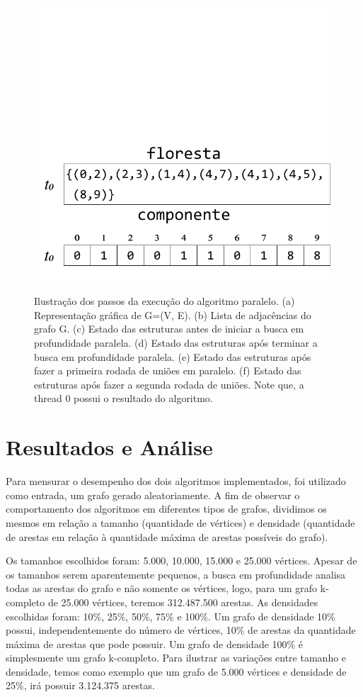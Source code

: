 \documentclass[12pt]{article}
\begin{document}
\begin{figure}[H]
{		\includegraphics[width=\linewidth]{figF.pdf}
	}
	\caption{Ilustração dos passos da execução do algoritmo paralelo. (a) Representação gráfica de G=(V, E). (b) Lista de adjacências do grafo G. (c) Estado das estruturas antes de iniciar a busca em profundidade paralela. (d) Estado das estruturas após terminar a busca em profundidade paralela. (e) Estado das estruturas após fazer a primeira rodada de uniões em paralelo. (f) Estado das estruturas após fazer a segunda rodada de uniões. Note que, a thread 0 possui o resultado do algoritmo.}
		\label{fig:1}
\end{figure}

\section{Resultados e Análise}
\label{resultados}

Para mensurar o desempenho dos dois algoritmos implementados, foi utilizado como entrada, um grafo gerado aleatoriamente. A fim de observar o comportamento dos algoritmos em diferentes tipos de grafos, dividimos os mesmos em relação a tamanho (quantidade de vértices) e densidade (quantidade de arestas em relação à quantidade máxima de arestas possíveis do grafo).

Os tamanhos escolhidos foram: 5.000, 10.000, 15.000 e 25.000 vértices. Apesar de os tamanhos serem aparentemente pequenos, a busca em profundidade analisa todas as arestas do grafo e não somente os vértices, logo, para um grafo k-completo de 25.000 vértices, teremos 312.487.500 arestas. As densidades escolhidas foram: 10\%, 25\%, 50\%, 75\% e 100\%. Um grafo de densidade 10\% possui, independentemente do número de vértices, 10\% de arestas da quantidade máxima de arestas que pode possuir. Um grafo de densidade 100\% é simplesmente um grafo k-completo. Para ilustrar as variações entre tamanho e densidade, temos como exemplo que um grafo de 5.000 vértices e densidade de 25\%, irá possuir 3.124.375 arestas.
\end{document}
